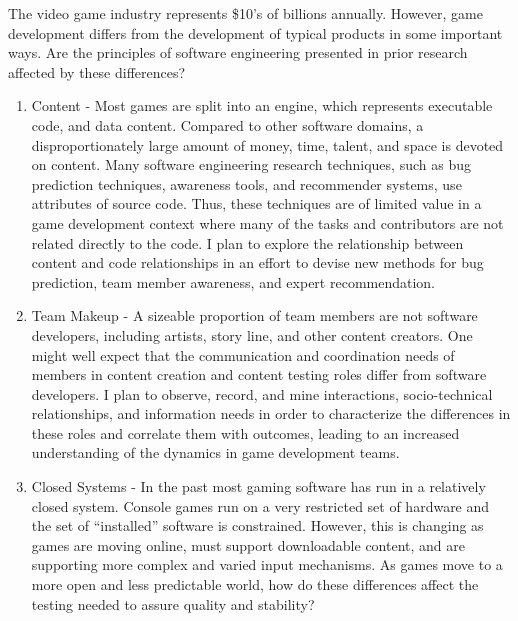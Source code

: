 \documentclass[10pt]{article}
\begin{document}
\begin{small}
\begin{enumerate}
\end{enumerate}

The video game industry represents \$10's of billions annually. However, game
development differs from the development of typical products in some important
ways.  Are the principles of software engineering presented in prior research
affected by these differences?

\begin{enumerate}

\item Content - Most games are split into an engine, which represents executable code,
    and data content. Compared to other software domains, a disproportionately large
    amount of money, time, talent, and space is devoted on content.  
    Many software engineering research techniques, such as
    bug prediction techniques, awareness tools, and recommender systems, use attributes
    of source code. Thus, these techniques are of limited value
    in a game development context where many of the tasks and contributors are
    not related directly to the code. I plan to explore the relationship between content
    and code relationships in an effort to devise new
    methods for bug prediction, team member awareness, and expert recommendation.

\item Team Makeup - A sizeable proportion of team members
    are not software developers, including artists, story line, and other content creators.
    One might well expect that the communication and coordination needs of members
    in content creation and content testing roles differ from software developers.  I plan to observe, record, and mine
    interactions, socio-technical relationships, and information 
    needs in order to characterize the differences in these roles
    and correlate them with outcomes, leading 
    to an increased understanding of the dynamics in game development teams.

\item Closed Systems - In the past most gaming software has run in a relatively closed
    system. Console games run on a very restricted set of hardware and the set of ``installed''
    software is constrained.  However, this is changing as games are moving online,
    must support downloadable content, and are supporting more complex and varied input 
    mechanisms.  As games move to a more open and less predictable world,
    how do these differences affect the testing needed to assure quality and stability?  


\end{enumerate}
\end{small}
\end{document}
